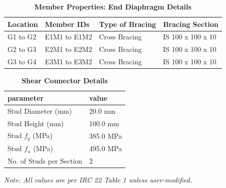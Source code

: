 \documentclass[12pt,a4paper]{report}
\numberwithin{table}{chapter}
\numberwithin{figure}{chapter}
\begin{document}
\vspace{0.4em}
\noindent
\setlength{\tabcolsep}{4pt}
\setlength\LTleft{0pt}
\setlength\LTright{\fill}

\begin{longtable}{|L{2.5cm}|L{2.5cm}|L{3.5cm}|L{4.5cm}|}
\caption{\textbf{Member Properties: End Diaphragm Details}}\\
\hline
\textbf{Location} & \textbf{Member IDs} & \textbf{Type of Bracing} & \textbf{Bracing Section} \\
\hline
G1 to G2 & E1M1 to E1M2 & Cross Bracing & IS 100 x 100 x 10 \\[6pt]
\hline
G2 to G3 & E2M1 to E2M2 & Cross Bracing & IS 100 x 100 x 10 \\[6pt]
\hline
G3 to G4 & E3M1 to E3M2 & Cross Bracing & IS 100 x 100 x 10 \\[6pt]
\hline
\end{longtable}



\label{subsec:shear-connectors}

\vspace{2.2em}

\vspace{0.4em}
\begin{longtable}{|L{5.5cm}|p{10.0cm}|}
\caption{\textbf{Shear Connector Details}}\\
\hline
\textbf{parameter} & \textbf{value} \\
\hline
\textnormal{Stud Diameter (mm)} & 20.0 mm \\[6pt]
\hline
\textnormal{Stud Height (mm)} & 100.0 mm \\[6pt]
\hline
\textnormal{Stud $f_y$ (MPa)} & 385.0 MPa \\[6pt]
\hline
\textnormal{Stud $f_u$ (MPa)} & 495.0 MPa \\[6pt]
\hline
\textnormal{No. of Studs per Section} & 2 \\[6pt]
\hline
\end{longtable}



\label{subsec:safety-factors}

\vspace{2.2em}

\vspace{0.3em}
\noindent\textit{Note: All values are per IRC 22 Table 1 unless user-modified.}
\end{document}
